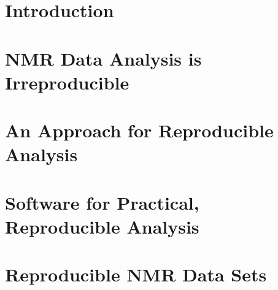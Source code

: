 \documentclass[11pt,a4paper]{report}
\begin{document}











\tableofcontents

\listoftables

\listoffigures

\chapter{Introduction}



\chapter{NMR Data Analysis is Irreproducible}



\chapter{An Approach for Reproducible Analysis}



\chapter{Software for Practical, Reproducible Analysis}



\chapter{Reproducible NMR Data Sets}




%


\end{document}
